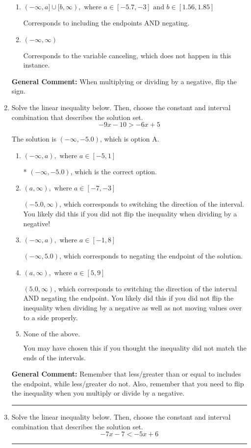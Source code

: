\documentclass{extbook}[14pt]
\newcommand{\litem}[1]{\item #1

\rule{\textwidth}{0.4pt}}
\begin{document}
\begin{enumerate}
{\begin{enumerate}[label=\Alph*.]
Corresponds to inverting the inequality and negating the solution.
\item \( (-\infty, a] \cup [b, \infty), \text{ where } a \in [-5.7, -3] \text{ and } b \in [1.56, 1.85] \)

Corresponds to including the endpoints AND negating.
\item \( (-\infty, \infty) \)

Corresponds to the variable canceling, which does not happen in this instance.
\end{enumerate}

\textbf{General Comment:} When multiplying or dividing by a negative, flip the sign.
}
\litem{
Solve the linear inequality below. Then, choose the constant and interval combination that describes the solution set.
\[ -9x -10 > -6x + 5 \]

The solution is \( (-\infty, -5.0) \), which is option A.\begin{enumerate}[label=\Alph*.]
\item \( (-\infty, a), \text{ where } a \in [-5, 1] \)

* $(-\infty, -5.0)$, which is the correct option.
\item \( (a, \infty), \text{ where } a \in [-7, -3] \)

 $(-5.0, \infty)$, which corresponds to switching the direction of the interval. You likely did this if you did not flip the inequality when dividing by a negative!
\item \( (-\infty, a), \text{ where } a \in [-1, 8] \)

 $(-\infty, 5.0)$, which corresponds to negating the endpoint of the solution.
\item \( (a, \infty), \text{ where } a \in [5, 9] \)

 $(5.0, \infty)$, which corresponds to switching the direction of the interval AND negating the endpoint. You likely did this if you did not flip the inequality when dividing by a negative as well as not moving values over to a side properly.
\item \( \text{None of the above}. \)

You may have chosen this if you thought the inequality did not match the ends of the intervals.
\end{enumerate}

\textbf{General Comment:} Remember that less/greater than or equal to includes the endpoint, while less/greater do not. Also, remember that you need to flip the inequality when you multiply or divide by a negative.
}
\litem{
Solve the linear inequality below. Then, choose the constant and interval combination that describes the solution set.
\[ -7x -7 < -5x + 6 \]

}
\end{enumerate}
\end{document}
